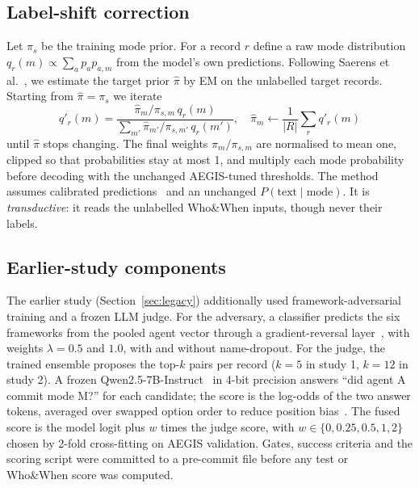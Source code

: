 \documentclass[conference]{IEEEtran}
\begin{document}
\subsection{Label-shift correction}
Let $\pi_s$ be the training mode prior. For a record $r$ define a raw mode distribution $q_r(m)\propto\sum_a p_a p_{a,m}$ from the model's own predictions. Following Saerens et al.~\cite{saerens}, we estimate the target prior $\hat\pi$ by EM on the unlabelled target records. Starting from $\hat\pi=\pi_s$ we iterate
\begin{equation}
q'_r(m)=\frac{\hat\pi_m/\pi_{s,m}\,q_r(m)}{\sum_{m'}\hat\pi_{m'}/\pi_{s,m'}\,q_r(m')},\quad \hat\pi_m\leftarrow\frac1{|R|}\sum_r q'_r(m)
\end{equation}
until $\hat\pi$ stops changing. The final weights $\hat\pi_m/\pi_{s,m}$ are normalised to mean one, clipped so that probabilities stay at most 1, and multiply each mode probability before decoding with the unchanged AEGIS-tuned thresholds. The method assumes calibrated predictions~\cite{alexandari,guo} and an unchanged $P(\text{text}\mid\text{mode})$. It is \emph{transductive}: it reads the unlabelled Who\&When inputs, though never their labels.

\subsection{Earlier-study components}
The earlier study (Section~\ref{sec:legacy}) additionally used framework-adversarial training and a frozen LLM judge. For the adversary, a classifier predicts the six frameworks from the pooled agent vector through a gradient-reversal layer~\cite{ganin}, with weights $\lambda=0.5$ and $1.0$, with and without name-dropout. For the judge, the trained ensemble proposes the top-$k$ pairs per record ($k=5$ in study 1, $k=12$ in study 2). A frozen Qwen2.5-7B-Instruct~\cite{qwen} in 4-bit precision answers ``did agent A commit mode M?'' for each candidate; the score is the log-odds of the two answer tokens, averaged over swapped option order to reduce position bias~\cite{zheng}. The fused score is the model logit plus $w$ times the judge score, with $w\in\{0,0.25,0.5,1,2\}$ chosen by 2-fold cross-fitting on AEGIS validation. Gates, success criteria and the scoring script were committed to a pre-commit file before any test or Who\&When score was computed.
\end{document}
